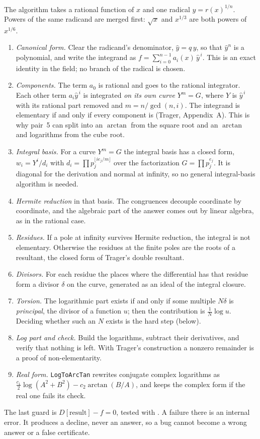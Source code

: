 The algorithm takes a rational function of \(x\) and one radical
\(y=r(x)^{1/n}\). Powers of the same radicand are merged first:
\(\sqrt{x}\) and \(x^{1/3}\) are both powers of \(x^{1/6}\).
\begin{enumerate}
\item \emph{Canonical form.} Clear the radicand's denominator, \(\hat
y=q\,y\), so that \(\hat y^n\) is a polynomial, and write the integrand as
\(f=\sum_{i=0}^{n-1}a_i(x)\,\hat y^{\,i}\). This is an exact identity in the field;
no branch of the radical is chosen.
\item \emph{Components.} The term \(a_0\) is rational and goes to the rational
integrator. Each other term \(a_i\hat y^{\,i}\) is integrated \emph{on its own
curve} \(Y^m=G\), where \(Y\) is \(\hat y^{\,i}\) with its rational part removed and
\(m=n/\gcd(n,i)\). The integrand is elementary if and only if every component is
(Trager, Appendix~A). This is why pair~5 can split into an \(\arctan\) from the
square root and an \(\arctan\) and logarithms from the cube root.
\item \emph{Integral basis.} For a curve \(Y^m=G\) the integral basis has a closed
form, \(w_i=Y^i/d_i\) with \(d_i=\prod p_j^{\lfloor i e_j/m\rfloor}\) over the
factorization \(G=\prod p_j^{e_j}\). It is diagonal for the derivation and normal
at infinity, so no general integral-basis algorithm is needed.
\item \emph{Hermite reduction} in that basis. The congruences decouple coordinate
by coordinate, and the algebraic part of the answer comes out by linear algebra,
as in the rational case.
\item \emph{Residues.} If a pole at infinity survives Hermite reduction, the
integral is not elementary. Otherwise the residues at the finite poles are the
roots of a resultant, the closed form of Trager's double resultant.
\item \emph{Divisors.} For each residue the places where the differential has that
residue form a divisor \(\delta\) on the curve, generated as an ideal of the
integral closure.
\item \emph{Torsion.} The logarithmic part exists if and only if some multiple
\(N\delta\) is \emph{principal}, the divisor of a function \(u\); then the
contribution is \(\tfrac{1}{N}\log u\). Deciding whether such an \(N\) exists is the
hard step (below).
\item \emph{Log part and check.} Build the logarithms, subtract their derivatives,
and verify that nothing is left. With Trager's construction a nonzero remainder is
a proof of non-elementarity.
\item \emph{Real form.} \texttt{LogToArcTan} rewrites conjugate complex logarithms
as \(\tfrac{c_1}{2}\log(A^2+B^2) - c_2\arctan(B/A)\), and keeps the complex form if
the real one fails its check.
\end{enumerate}
The last guard is \(D[\text{result}]-f=0\), tested with . A
failure there is an internal error. It produces a decline, never an answer, so a
bug cannot become a wrong answer or a false certificate.

